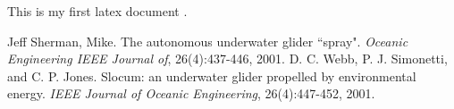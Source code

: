 \documentclass[12pt]{article}
\begin{document}
This is my first latex document \cite{ungli,envi}.
\begin{thebibliography}{99}
 Jeff Sherman, Mike. The autonomous underwater glider ``spray". \textit{Oceanic Engineering IEEE Journal of}, 26(4):437-446, 2001.
D. C. Webb, P. J. Simonetti, and C. P. Jones. Slocum: an underwater glider propelled by environmental energy. \textit{IEEE Journal of Oceanic Engineering}, 26(4):447-452, 2001.

\end{thebibliography}
\end{document}
